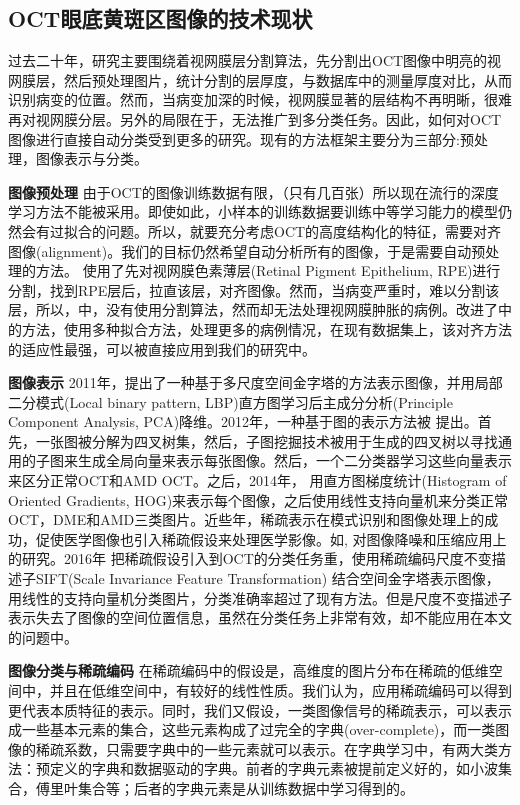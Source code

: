     \subsection{OCT眼底黄斑区图像的技术现状}
    过去二十年，研究主要围绕着视网膜层分割算法\cite{}，先分割出OCT图像中明亮的视网膜层，然后预处理图片，统计分割的层厚度，与数据库中的测量厚度对比，从而识别病变的位置。然而，当病变加深的时候，视网膜显著的层结构不再明晰，很难再对视网膜分层。另外的局限在于，无法推广到多分类任务。因此，如何对OCT图像进行直接自动分类受到更多的研究。现有的方法框架主要分为三部分:预处理，图像表示与分类。


    \textbf{图像预处理}
    由于OCT的图像训练数据有限，（只有几百张）所以现在流行的深度学习方法不能被采用。即使如此，小样本的训练数据要训练中等学习能力的模型仍然会有过拟合的问题。所以，就要充分考虑OCT的高度结构化的特征，需要对齐图像(alignment)。我们的目标仍然希望自动分析所有的图像，于是需要自动预处理的方法。\cite{} 使用了先对视网膜色素薄层(Retinal Pigment Epithelium, RPE)进行分割，找到RPE层后，拉直该层，对齐图像。然而，当病变严重时，难以分割该层，所以，\cite{}中，没有使用分割算法，然而却无法处理视网膜肿胀的病例。\cite{}改进了\cite{}中的方法，使用多种拟合方法，处理更多的病例情况，在现有数据集上，该对齐方法的适应性最强，可以被直接应用到我们的研究中。

    \textbf{图像表示}
    2011年，\cite{}提出了一种基于多尺度空间金字塔的方法表示图像，并用局部二分模式(Local binary pattern, LBP)直方图学习后主成分分析(Principle Component Analysis, PCA)降维。2012年，一种基于图的表示方法被\cite{} 提出。首先，一张图被分解为四叉树集，然后，子图挖掘技术被用于生成的四叉树以寻找通用的子图来生成全局向量来表示每张图像。然后，一个二分类器学习这些向量表示来区分正常OCT和AMD OCT。之后，2014年，\cite{} 用直方图梯度统计(Histogram of Oriented Gradients, HOG)来表示每个图像，之后使用线性支持向量机来分类正常OCT，DME和AMD三类图片。近些年，稀疏表示在模式识别和图像处理上的成功，促使医学图像也引入稀疏假设来处理医学影像。如\cite{}, \cite{}对图像降噪和压缩应用上的研究。2016年\cite{} 把稀疏假设引入到OCT的分类任务重，使用稀疏编码尺度不变描述子SIFT(Scale Invariance Feature Transformation) 结合空间金字塔表示图像，用线性的支持向量机分类图片，分类准确率超过了现有方法。但是尺度不变描述子表示失去了图像的空间位置信息，虽然在分类任务上非常有效，却不能应用在本文的问题中。

    \textbf{图像分类与稀疏编码}
    在稀疏编码中的假设是，高维度的图片分布在稀疏的低维空间中，并且在低维空间中，有较好的线性性质。我们认为，应用稀疏编码可以得到更代表本质特征的表示。同时，我们又假设，一类图像信号的稀疏表示，可以表示成一些基本元素的集合，这些元素构成了过完全的字典(over-complete)，而一类图像的稀疏系数，只需要字典中的一些元素就可以表示。在字典学习中，有两大类方法：预定义的字典和数据驱动的字典。前者的字典元素被提前定义好的，如小波集合，傅里叶集合等；后者的字典元素是从训练数据中学习得到的。

